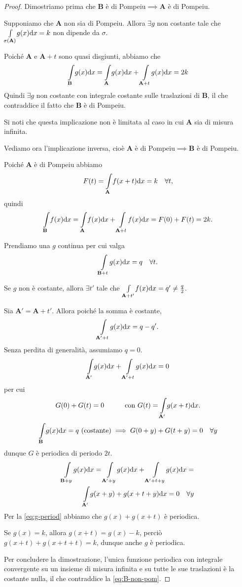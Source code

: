 \documentclass[12pt]{article}
\newcommand\ins[1]{\mathbf #1}
\newcommand\pom{di Pompeiu}
\newcommand\intes[2]{\int\limits_{#1}\!#2\text dx}
\newcommand\intesx[2]{\int\limits_{#1}\!#2(x)\text dx}
\theoremstyle{definition}
\begin{document}
\begin{proof}Dimostriamo prima che $\ins B$ è \pom{}$\implies\ins A$ è \pom{}.

Supponiamo che $\ins A$ non sia \pom{}. Allora $\exists g$ non costante
tale che $\intesx {\sigma(\ins A)}g=k$ non dipende da $\sigma$.

Poiché $\ins A$ e $\ins A+t$ sono quasi disgiunti, abbiamo che
\begin{equation}\label{eq:quasi-disgiunti}
\intesx{\ins B}g=\intesx{\ins A}g+\intesx{\ins A+t}g=2k
\end{equation}
Quindi $\exists g$ non costante con integrale costante sulle traslazioni di $\ins B$,
il che contraddice il fatto che $\ins B$ è \pom{}.

Si noti che questa implicazione non è limitata al caso in cui $\ins A$ sia di misura infinita.

Vediamo ora l'implicazione inversa, cioè $\ins A$ è \pom{}$\implies\ins B$ è \pom{}.

Poiché $\ins A$ è \pom{} abbiamo 
\begin{equation}\label{eq:A-pom}
F(t)=\intes{\ins A}{f(x+t)}=k\quad\forall t ,
\end{equation}
quindi \[\intesx{\ins B}f=\intesx{\ins A}f + \intesx{\ins A+t}f=F(0)+F(t)=2k . \]

Prendiamo una $g$ continua per cui valga \begin{equation}\label{eq:B-non-pom}
\intesx {\ins B+t}g=q\quad\forall t .
\end{equation}

Se $g$ non è costante, allora $\exists t'$ tale che
$\intesx{\ins A+t'}f=q'\not=\frac q2$.%

Sia $\ins{A'}=\ins A+t'$. Allora poiché la somma è costante,
\[\intesx{\ins{A'}+t}g=q-q' . \]
Senza perdita di generalità, assumiamo $q=0$.
\[\intesx{\ins{A'}}g+\intesx{\ins{A'}+t}g=0\] per cui
\[G(0)+G(t)=0\quad\quad\quad\text{con }G(t)=\intes {\ins{A'}} {g(x+t)} . \]
\[\intesx{\ins B}g=q\text{ (costante)}\implies G(0+y)+G(t+y)=0\quad\forall y\]
dunque $G$ è periodica di periodo $2t$.
\begin{equation}\label{eq:g-period}
\begin{split}
\intesx{\ins B+y}g=\intesx{\ins{A'}+y}g+\intesx{\ins{A'}+t+y}g=\\
\intes{\ins{A'}}{g(x+y)+g(x+t+y)}=0\quad\forall y
\end{split}\end{equation}
Per la \eqref{eq:g-period} abbiamo che $g(x)+g(x+t)$ è periodica.

Se $g(x)=k$, allora $g(x+t)=g(x)-k$, perciò $g(x+t)+g(x+t+t)=k$,
dunque anche $g$ è periodica.

Per concludere la dimostrazione, l'unica funzione periodica
con integrale convergente su un insieme di misura infinita
e su tutte le sue traslazioni è la costante nulla,
il che contraddice la \eqref{eq:B-non-pom}.
\end{proof}
\end{document}
